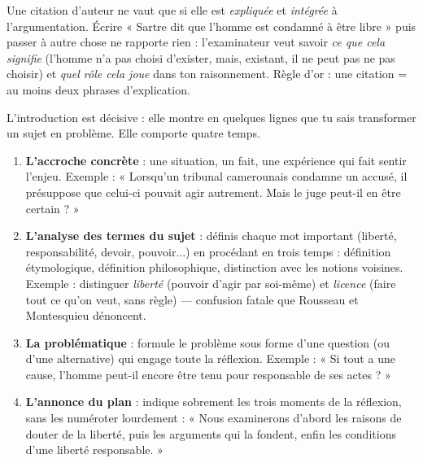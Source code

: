 \documentclass[11pt]{article}
\newcounter{popsec}
\newcounter{popsub}
\newcommand{\courssub}[1]{%
  \stepcounter{popsub}%
  \par\vspace{9pt}\noindent{\popxbold\fontsize{11.5}{13}\selectfont\color{popink}{\color{poporange}\thepopsec.\thepopsub}\hspace{6pt}#1}\par\nopagebreak\vspace{4pt}
}
\begin{document}
\begin{attention}
Une citation d'auteur ne vaut que si elle est \emph{expliquée} et \emph{intégrée} à l'argumentation. Écrire « Sartre dit que l'homme est condamné à être libre » puis passer à autre chose ne rapporte rien : l'examinateur veut savoir \emph{ce que cela signifie} (l'homme n'a pas choisi d'exister, mais, existant, il ne peut pas ne pas choisir) et \emph{quel rôle cela joue} dans ton raisonnement. Règle d'or : une citation = au moins deux phrases d'explication.
\end{attention}

\courssub{Méthode de l'introduction}

L'introduction est décisive : elle montre en quelques lignes que tu sais transformer un sujet en problème. Elle comporte quatre temps.

\begin{methode}
\begin{enumerate}
\item \textbf{L'accroche concrète} : une situation, un fait, une expérience qui fait sentir l'enjeu. Exemple : « Lorsqu'un tribunal camerounais condamne un accusé, il présuppose que celui-ci pouvait agir autrement. Mais le juge peut-il en être certain ? »
\item \textbf{L'analyse des termes du sujet} : définis chaque mot important (liberté, responsabilité, devoir, pouvoir...) en procédant en trois temps : définition étymologique, définition philosophique, distinction avec les notions voisines. Exemple : distinguer \emph{liberté} (pouvoir d'agir par soi-même) et \emph{licence} (faire tout ce qu'on veut, sans règle) — confusion fatale que Rousseau et Montesquieu dénoncent.
\item \textbf{La problématique} : formule le problème sous forme d'une question (ou d'une alternative) qui engage toute la réflexion. Exemple : « Si tout a une cause, l'homme peut-il encore être tenu pour responsable de ses actes ? »
\item \textbf{L'annonce du plan} : indique sobrement les trois moments de la réflexion, sans les numéroter lourdement : « Nous examinerons d'abord les raisons de douter de la liberté, puis les arguments qui la fondent, enfin les conditions d'une liberté responsable. »
\end{enumerate}
\end{methode}
\end{document}
